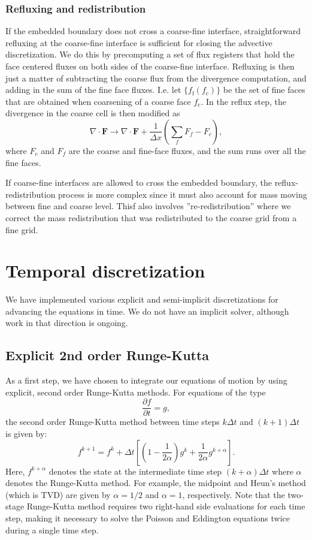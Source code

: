 \documentclass[3p]{elsarticle}
\begin{document}
\subsubsection{Refluxing and redistribution}
\label{sec:reflux}
If the embedded boundary does not cross a coarse-fine interface, straightforward refluxing at the coarse-fine interface is sufficient for closing the advective discretization. We do this by precomputing a set of flux registers that hold the face centered fluxes on both sides of the coarse-fine interface. Refluxing is then just a matter of subtracting the coarse flux from the divergence computation, and adding in the sum of the fine face fluxes. I.e. let $\{f_{\text{f}}(f_{\text{c}})\}$ be the set of fine faces that are obtained when coarsening of a coarse face $f_{\text{c}}$. In the reflux step, the divergence in the coarse cell is then modified as
\begin{equation}
  \nabla\cdot\bm{F} \rightarrow \nabla\cdot\bm{F} + \frac{1}{\Delta x}\left(\sum_{f} F_{f} - F_c\right),
\end{equation}
where $F_{c}$ and $F_{f}$ are the coarse and fine-face fluxes, and the sum runs over all the fine faces. 

If coarse-fine interfaces are allowed to cross the embedded boundary, the reflux-redistribution process is more complex since it must also account for mass moving between fine and coarse level. Thisf also involves ''re-redistribution'' where we correct the mass redistribution that was redistributed to the coarse grid from a fine grid.


\section{Temporal discretization}
We have implemented various explicit and semi-implicit discretizations for advancing the equations in time. We do not have an implicit solver, although work in that direction is ongoing. 

\subsection{Explicit 2nd order Runge-Kutta}
As a first step, we have chosen to integrate our equations of motion by using explicit, second order Runge-Kutta methods. For equations of the type
\begin{equation}
  \label{eq:ode}
  \frac{\partial f}{\partial t} = g,
\end{equation}
the second order Runge-Kutta method between time steps $k\Delta t$ and $(k+1)\Delta t$ is given by: 
\begin{equation}
  f^{k+1} = f^k + \Delta t\left[\left(1 - \frac{1}{2\alpha}\right)g^k + \frac{1}{2\alpha}g^{k+\alpha}\right].
\end{equation}
Here, $f^{k+\alpha}$ denotes the state at the intermediate time step $(k+\alpha)\Delta t$ where $\alpha$ denotes the Runge-Kutta method. For example, the midpoint and Heun's method (which is TVD) are given by $\alpha = 1/2$ and $\alpha = 1$, respectively. Note that the two-stage Runge-Kutta method requires two right-hand side evaluations for each time step, making it necessary to solve the Poisson and Eddington equations twice during a single time step.
\end{document}
